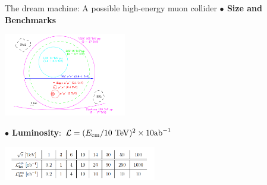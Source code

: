 \documentclass[aspectratio=169]{beamer}
\begin{document}
\begin{frame}{The dream machine: A possible high-energy muon collider}
	\vspace{2mm}\hspace{3mm}\textcolor{PittRoyal}{\bf $\bullet$ Size and Benchmarks}\\
	\begin{center}
	\includegraphics[width=0.4\textwidth]{figs/muCsize.png}\\
	\hspace{40mm}
	\end{center}
	\hspace{5mm}\small{\textcolor{PittRoyal}{\bf $\bullet$ Luminosity}: ${\cal L} = (E_{\rm cm}/10~{\rm TeV})^2 \times 10 {\rm ab}^{-1}$}
	\begin{center}
	\includegraphics[width=0.5\textwidth]{figs/muCLumi.png}\\
	\hspace{40mm}
	\end{center}
\end{frame}
\end{document}
